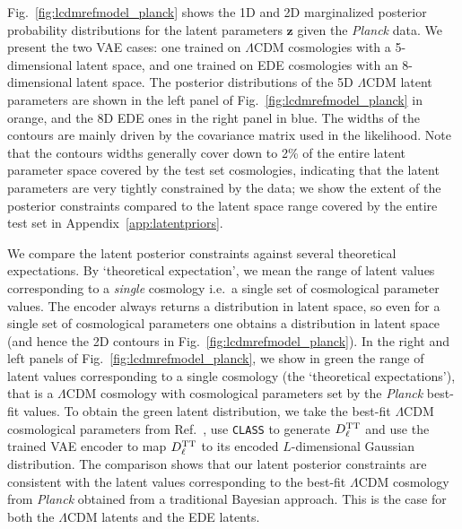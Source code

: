 \documentclass[aps, prd, reprint, superscriptaddress, nofootinbib, bibnotes]{revtex4-2}
\newcommand{\Planck}{\textit{Planck}}
\begin{document}
 

Fig.~\ref{fig:lcdmrefmodel_planck} shows the 1D and 2D marginalized posterior probability distributions for the latent parameters $\bm{z}$ given the \Planck{} data. We present the two VAE cases: one trained on $\Lambda$CDM cosmologies with a 5-dimensional latent space, and one trained on EDE cosmologies with an 8-dimensional latent space. The posterior distributions of the 5D $\Lambda$CDM latent parameters are shown in the left panel of Fig.~\ref{fig:lcdmrefmodel_planck} in orange, and the 8D EDE ones in the right panel in blue. The widths of the contours are mainly driven by the covariance matrix used in the likelihood. Note that the contours widths generally cover down to 2\% of the entire latent parameter space covered by the test set cosmologies, indicating that the latent parameters are very tightly constrained by the data; we show the extent of the posterior constraints compared to the latent space range covered by the entire test set in Appendix~\ref{app:latentpriors}.

We compare the latent posterior constraints against several theoretical expectations. By `theoretical expectation', we mean the range of latent values corresponding to a \textit{single} cosmology i.e.\ a single set of cosmological parameter values. The encoder always returns a distribution in latent space, so even for a single set of cosmological parameters one obtains a distribution in latent space (and hence the 2D contours in Fig.~\ref{fig:lcdmrefmodel_planck}). In the right and left panels of Fig.~\ref{fig:lcdmrefmodel_planck}, we show in green the range of latent values corresponding to a single cosmology (the `theoretical expectations'), that is a $\Lambda$CDM cosmology with cosmological parameters set by the \Planck{} best-fit values. To obtain the green latent distribution, we take the best-fit $\Lambda$CDM cosmological parameters from Ref.~\cite{Planck:2018vyg}, use \texttt{CLASS} to generate $D_{\ell}^{\rm TT}$ and use the trained VAE encoder to map $D_{\ell}^{\rm TT}$ to its encoded $L$-dimensional Gaussian distribution. The comparison shows that our latent posterior constraints are consistent with the latent values corresponding to the best-fit $\Lambda$CDM cosmology from \Planck{} obtained from a traditional Bayesian approach. This is the case for both the $\Lambda$CDM latents and the EDE latents.
\end{document}

